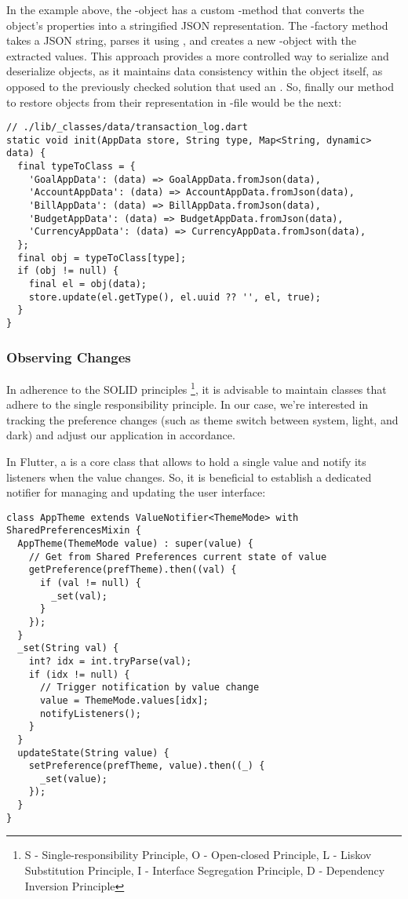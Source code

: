 \noindent In the example above, the -object has a custom -method that converts the object's 
properties into a stringified JSON representation. The -factory method takes a JSON string, parses it using 
, and creates a new -object with the extracted values. This approach provides a more 
controlled way to serialize and deserialize objects, as it maintains data consistency within the object itself,
as opposed to the previously checked solution that used an . So, finally our method to restore objects 
from their representation in -file would be the next:

\begin{lstlisting}[firstnumber=54]
// ./lib/_classes/data/transaction_log.dart
static void init(AppData store, String type, Map<String, dynamic> data) {
  final typeToClass = {
    'GoalAppData': (data) => GoalAppData.fromJson(data),
    'AccountAppData': (data) => AccountAppData.fromJson(data),
    'BillAppData': (data) => BillAppData.fromJson(data),
    'BudgetAppData': (data) => BudgetAppData.fromJson(data),
    'CurrencyAppData': (data) => CurrencyAppData.fromJson(data),
  };
  final obj = typeToClass[type];
  if (obj != null) {
    final el = obj(data);
    store.update(el.getType(), el.uuid ?? '', el, true);
  }
}
\end{lstlisting}


\subsubsection{Observing Changes}

In adherence to the SOLID principles \footnote{S - Single-responsibility Principle, O - Open-closed Principle, L - 
Liskov Substitution Principle, I - Interface Segregation Principle, D - Dependency Inversion Principle}, it is advisable 
to maintain classes that adhere to the single responsibility principle. In our case, we're interested in tracking the 
preference changes (such as theme switch between system, light, and dark) and adjust our application in accordance.

In Flutter, a  is a core class that allows to hold a single value and notify its listeners when the 
value changes. So, it is beneficial to establish a dedicated notifier for managing and updating the user interface:

\begin{lstlisting}
class AppTheme extends ValueNotifier<ThemeMode> with SharedPreferencesMixin {
  AppTheme(ThemeMode value) : super(value) {
    // Get from Shared Preferences current state of value
    getPreference(prefTheme).then((val) {
      if (val != null) {
        _set(val);
      }
    });
  }
  _set(String val) {
    int? idx = int.tryParse(val);
    if (idx != null) {
      // Trigger notification by value change
      value = ThemeMode.values[idx];
      notifyListeners();
    }
  }
  updateState(String value) {
    setPreference(prefTheme, value).then((_) {
      _set(value);
    });
  }
}
\end{lstlisting}

